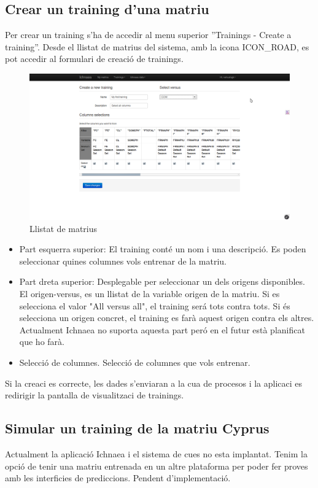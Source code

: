 \begin{itemize}
\section{Crear un training d'una matriu}
Per crear un training s'ha de accedir al menu superior ''Trainings - Create a training''. Desde el llistat de matrius del sistema, amb la icona ICON_ROAD, es pot accedir al formulari de creaci\'{o} de trainings.
\begin{figure}[h!]
  \centering
  \includegraphics[scale=0.2]{img/userguide/training_create.png}
  \caption{Llistat de matrius}
  \label{fig:placement}
\end{figure}
\begin{itemize}
\item Part esquerra superior: El training cont\'{e} un nom i una descripci\'{o}. Es poden seleccionar quines columnes vols entrenar de la matriu. 
\item Part dreta superior: Desplegable per seleccionar un dels origens disponibles.  El origen-versus, es un llistat de la variable origen de la matriu. Si es selecciona el valor "All versus all", el training ser\'{a} tots contra tots. Si \'{e}s selecciona un origen concret, el training es far\`{a} aquest origen contra els altres. Actualment Ichnaea no suporta aquesta part per\'{o} en el futur est\`{a} planificat que ho far\`{a}.
\item Selecci\'{o} de columnes. Selecci\'{o} de columnes que vols entrenar.
\end{itemize}

Si la creaci \´e{s} correcte, les dades s'enviaran a la cua de procesos i la aplicaci es redirigir la pantalla de visualitzaci de trainings.

\subsection{Simular un training de la matriu Cyprus}
Actualment la aplicaci\'{o} Ichnaea i el sistema de cues no esta implantat. Tenim la opci\'{o} de tenir una matriu entrenada en un altre plataforma per poder fer proves amb les interficies de prediccions. Pendent d'implementaci\'{o}.


\end{itemize}
